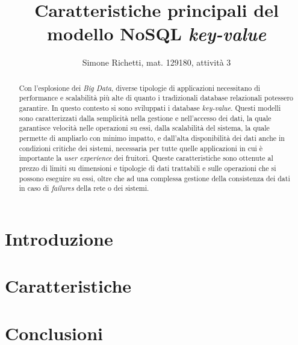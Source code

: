 \documentclass[a4paper, 12pt]{article}
\title{\bf Caratteristiche principali del modello NoSQL \textit{key-value}}
\author{Simone Richetti, mat. 129180, attività 3}
\date{}
\begin{document}
\maketitle

\begingroup{}
\begin{abstract}
Con l'esplosione dei \textit{Big Data}, diverse tipologie di applicazioni necessitano di performance e scalabilità più alte di quanto i tradizionali database relazionali potessero garantire. In questo contesto si sono sviluppati i database \textit{key-value}. Questi modelli sono caratterizzati dalla semplicità nella gestione e nell'accesso dei dati, la quale garantisce velocità nelle operazioni su essi, dalla scalabilità del sistema, la quale permette di ampliarlo con minimo impatto, e dall'alta disponibilità dei dati anche in condizioni critiche dei sistemi, necessaria per tutte quelle applicazioni in cui è importante la \textit{user experience} dei fruitori. Queste caratteristiche sono ottenute al prezzo di limiti su dimensioni e tipologie di dati trattabili e sulle operazioni che si possono eseguire su essi, oltre che ad una complessa gestione della consistenza dei dati in caso di \textit{failures} della rete o dei sistemi.
\end{abstract}\endgroup

\section{Introduzione}


\section{Caratteristiche}


\section{Conclusioni}



\end{document}
